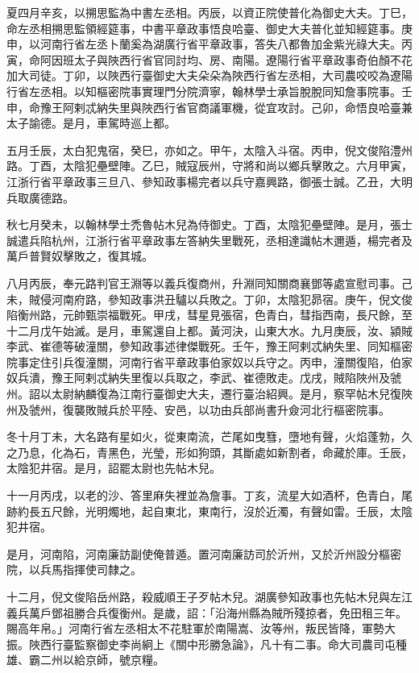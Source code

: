\begin{pinyinscope}
 夏四月辛亥，以搠思監為中書左丞相。丙辰，以資正院使普化為御史大夫。丁巳，命左丞相搠思監領經筵事，中書平章政事悟良哈臺、御史大夫普化並知經筵事。庚申，以河南行省左丞卜蘭奚為湖廣行省平章政事，答失八都魯加金紫光祿大夫。丙寅，命阿因班太子與陜西行省官同討均、房、南陽。遼陽行省平章政事奇伯顏不花加大司徒。丁卯，以陜西行臺御史大夫朵朵為陜西行省左丞相，大司農咬咬為遼陽行省左丞相。以知樞密院事實理門分院濟寧，翰林學士承旨脫脫同知詹事院事。壬申，命豫王阿剌忒納失里與陜西行省官商議軍機，從宜攻討。己卯，命悟良哈臺兼太子諭德。是月，車駕時巡上都。



 五月壬辰，太白犯鬼宿，癸巳，亦如之。甲午，太陰入斗宿。丙申，倪文俊陷澧州路。丁酉，太陰犯壘壁陣。乙巳，賊寇辰州，守將和尚以鄉兵擊敗之。六月甲寅，江浙行省平章政事三旦八、參知政事楊完者以兵守嘉興路，御張士誠。乙丑，大明兵取廣德路。



 秋七月癸未，以翰林學士禿魯帖木兒為侍御史。丁酉，太陰犯壘壁陣。是月，張士誠遣兵陷杭州，江浙行省平章政事左答納失里戰死，丞相達識帖木邇遁，楊完者及萬戶普賢奴擊敗之，復其城。



 八月丙辰，奉元路判官王淵等以義兵復商州，升淵同知關商襄鄧等處宣慰司事。己未，賊侵河南府路，參知政事洪丑驢以兵敗之。丁卯，太陰犯昴宿。庚午，倪文俊陷衡州路，元帥甄崇福戰死。甲戌，彗星見張宿，色青白，彗指西南，長尺餘，至十二月戊午始滅。是月，車駕還自上都。黃河決，山東大水。九月庚辰，汝、潁賊李武、崔德等破潼關，參知政事述律傑戰死。壬午，豫王阿剌忒納失里、同知樞密院事定住引兵復潼關，河南行省平章政事伯家奴以兵守之。丙申，潼關復陷，伯家奴兵潰，豫王阿剌忒納失里復以兵取之，李武、崔德敗走。戊戌，賊陷陜州及虢州。詔以太尉納麟復為江南行臺御史大夫，遷行臺治紹興。是月，察罕帖木兒復陜州及虢州，復襲敗賊兵於平陸、安邑，以功由兵部尚書升僉河北行樞密院事。



 冬十月丁未，大名路有星如火，從東南流，芒尾如曳篲，墮地有聲，火焰蓬勃，久之乃息，化為石，青黑色，光瑩，形如狗頭，其斷處如新割者，命藏於庫。壬辰，太陰犯井宿。是月，詔罷太尉也先帖木兒。



 十一月丙戌，以老的沙、答里麻失裡並為詹事。丁亥，流星大如酒杯，色青白，尾跡約長五尺餘，光明燭地，起自東北，東南行，沒於近濁，有聲如雷。壬辰，太陰犯井宿。



 是月，河南陷，河南廉訪副使俺普遁。置河南廉訪司於沂州，又於沂州設分樞密院，以兵馬指揮使司隸之。



 十二月，倪文俊陷岳州路，殺威順王子歹帖木兒。湖廣參知政事也先帖木兒與左江義兵萬戶鄧祖勝合兵復衡州。是歲，詔：「沿海州縣為賊所殘掠者，免田租三年。賜高年帛。」河南行省左丞相太不花駐軍於南陽嵩、汝等州，叛民皆降，軍勢大振。陜西行臺監察御史李尚絅上《關中形勝急論》，凡十有二事。命大司農司屯種雄、霸二州以給京師，號京糧。



\end{pinyinscope}